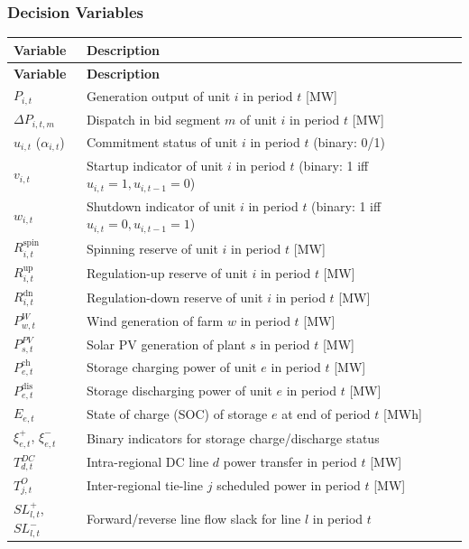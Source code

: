 \subsubsection{Decision Variables}

\begin{longtable}{lL{10.5cm}}
\toprule
\textbf{Variable} & \textbf{Description} \\
\midrule
\endfirsthead
\toprule
\textbf{Variable} & \textbf{Description} \\
\midrule
\endhead
$P_{i,t}$           & Generation output of unit $i$ in period $t$ [MW] \\
$\Delta P_{i,t,m}$  & Dispatch in bid segment $m$ of unit $i$ in period $t$ [MW] \\
$u_{i,t}$ ($\alpha_{i,t}$) & Commitment status of unit $i$ in period $t$ (binary: 0/1) \\
$v_{i,t}$           & Startup indicator of unit $i$ in period $t$ (binary: 1 iff $u_{i,t}=1, u_{i,t-1}=0$) \\
$w_{i,t}$           & Shutdown indicator of unit $i$ in period $t$ (binary: 1 iff $u_{i,t}=0, u_{i,t-1}=1$) \\
$R^{\mathrm{spin}}_{i,t}$ & Spinning reserve of unit $i$ in period $t$ [MW] \\
$R^{\mathrm{up}}_{i,t}$   & Regulation-up reserve of unit $i$ in period $t$ [MW] \\
$R^{\mathrm{dn}}_{i,t}$   & Regulation-down reserve of unit $i$ in period $t$ [MW] \\
$P^{W}_{w,t}$       & Wind generation of farm $w$ in period $t$ [MW] \\
$P^{PV}_{s,t}$      & Solar PV generation of plant $s$ in period $t$ [MW] \\
$P^{\mathrm{ch}}_{e,t}$  & Storage charging power of unit $e$ in period $t$ [MW] \\
$P^{\mathrm{dis}}_{e,t}$ & Storage discharging power of unit $e$ in period $t$ [MW] \\
$E_{e,t}$           & State of charge (SOC) of storage $e$ at end of period $t$ [MWh] \\
$\xi^{+}_{e,t}$, $\xi^{-}_{e,t}$ & Binary indicators for storage charge/discharge status \\
$T^{DC}_{d,t}$      & Intra-regional DC line $d$ power transfer in period $t$ [MW] \\
$T^{O}_{j,t}$       & Inter-regional tie-line $j$ scheduled power in period $t$ [MW] \\
$SL^{+}_{l,t}$, $SL^{-}_{l,t}$ & Forward/reverse line flow slack for line $l$ in period $t$ \\

\end{longtable}
